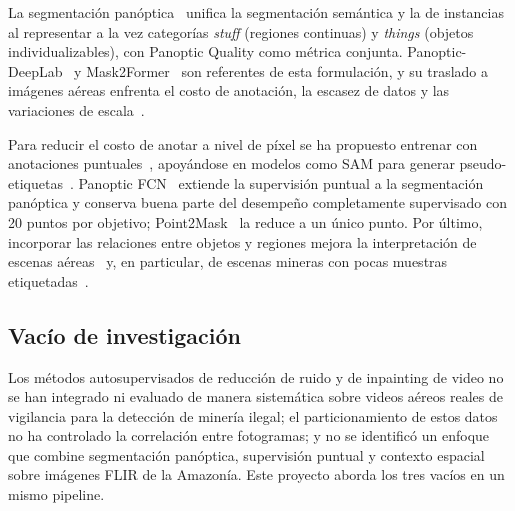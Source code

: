 La segmentación panóptica~\cite{kirillov2019panoptic} unifica la segmentación semántica y la de instancias al representar a la vez categorías \textit{stuff} (regiones continuas) y \textit{things} (objetos individualizables), con Panoptic Quality como métrica conjunta. Panoptic-DeepLab~\cite{cheng2020panopticdeeplab} y Mask2Former~\cite{cheng2022mask2former} son referentes de esta formulación, y su traslado a imágenes aéreas enfrenta el costo de anotación, la escasez de datos y las variaciones de escala~\cite{decarvalho2022panoptic,cheng2024uavreview}.

Para reducir el costo de anotar a nivel de píxel se ha propuesto entrenar con anotaciones puntuales~\cite{wang2020weakly,wu2022dbfnet,chan2025sparse}, apoyándose en modelos como SAM para generar pseudo-etiquetas~\cite{metasam2}. Panoptic FCN~\cite{li2022panopticfcn} extiende la supervisión puntual a la segmentación panóptica y conserva buena parte del desempeño completamente supervisado con 20 puntos por objetivo; Point2Mask~\cite{li2023point2mask} la reduce a un único punto. Por último, incorporar las relaciones entre objetos y regiones mejora la interpretación de escenas aéreas~\cite{ren2024context} y, en particular, de escenas mineras con pocas muestras etiquetadas~\cite{dong2025mining}.

\subsection{Vacío de investigación}
Los métodos autosupervisados de reducción de ruido y de inpainting de video no se han integrado ni evaluado de manera sistemática sobre videos aéreos reales de vigilancia para la detección de minería ilegal; el particionamiento de estos datos no ha controlado la correlación entre fotogramas; y no se identificó un enfoque que combine segmentación panóptica, supervisión puntual y contexto espacial sobre imágenes FLIR de la Amazonía. Este proyecto aborda los tres vacíos en un mismo pipeline.
